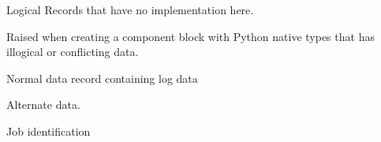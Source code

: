 \documentclass[letterpaper,10pt,english]{sphinxmanual}
\begin{document}

\begin{fulllineitems}
\label{\detokenize{ref/LIS/core/LogiRec:TotalDepth.LIS.core.LogiRec.ExceptionLrNotImplemented}}
Logical Records that have no implementation here.

\end{fulllineitems}


\begin{fulllineitems}
\label{\detokenize{ref/LIS/core/LogiRec:TotalDepth.LIS.core.LogiRec.ExceptionCbWrite}}
Raised when creating a component block with Python native types that has illogical or conflicting data.

\end{fulllineitems}


\begin{fulllineitems}
\label{\detokenize{ref/LIS/core/LogiRec:TotalDepth.LIS.core.LogiRec.LR_TYPE_NORMAL_DATA}}
Normal data record containing log data

\end{fulllineitems}


\begin{fulllineitems}
\label{\detokenize{ref/LIS/core/LogiRec:TotalDepth.LIS.core.LogiRec.LR_TYPE_ALTERNATE_DATA}}
Alternate data.

\end{fulllineitems}


\begin{fulllineitems}
\label{\detokenize{ref/LIS/core/LogiRec:TotalDepth.LIS.core.LogiRec.LR_TYPE_JOB_ID}}
Job identification

\end{fulllineitems}
\end{document}
